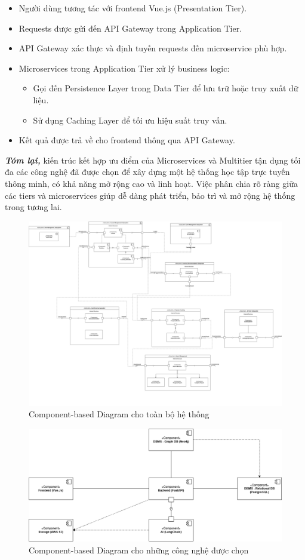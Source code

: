 \begin{itemize}
    \item Người dùng tương tác với frontend Vue.js (Presentation Tier).
    \item Requests được gửi đến API Gateway trong Application Tier.
    \item API Gateway xác thực và định tuyến requests đến microservice phù hợp.
    \item Microservices trong Application Tier xử lý business logic:
    \begin{itemize}
        \item Gọi đến Persistence Layer trong Data Tier để lưu trữ hoặc truy xuất dữ liệu.
        \item Sử dụng Caching Layer để tối ưu hiệu suất truy vấn.
    \end{itemize}
    \item Kết quả được trả về cho frontend thông qua API Gateway.
\end{itemize}
\textbf{\textit{Tóm lại,}} kiến trúc kết hợp ưu điểm của Microservices và Multitier tận dụng tối đa các công nghệ đã được chọn để xây dựng một hệ thống học tập trực tuyến thông minh, có khả năng mở rộng cao và linh hoạt. Việc phân chia rõ ràng giữa các tiers và microservices giúp dễ dàng phát triển, bảo trì và mở rộng hệ thống trong tương lai.
\begin{figure}[H]
    \centering
    \includegraphics[width=\linewidth]{Images/component_diagram/component-All.drawio.png}
    \caption{Component-based Diagram cho toàn bộ hệ thống}
    \label{fig:enter-label}
\end{figure}
\begin{figure}[H]
    \centering
    \includegraphics[width=\linewidth]{Images/component_diagram/component-Selected technologies.drawio.png}
    \caption{Component-based Diagram cho những công nghệ được chọn}
    \label{fig:enter-label}
\end{figure}
